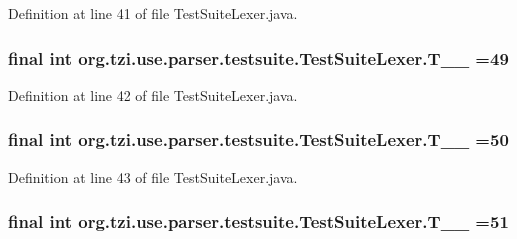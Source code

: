 Definition at line 41 of file Test\-Suite\-Lexer.\-java.

\hypertarget{classorg_1_1tzi_1_1use_1_1parser_1_1testsuite_1_1_test_suite_lexer_a32aa23d39ec0d05cee4b4039a1a57208}{
\subsubsection[{T\-\_\-\-\_\-49}]{\setlength{\rightskip}{0pt plus 5cm}final int org.\-tzi.\-use.\-parser.\-testsuite.\-Test\-Suite\-Lexer.\-T\-\_\-\-\_ =49\hspace{0.3cm}{\ttfamily [static]}}}\label{classorg_1_1tzi_1_1use_1_1parser_1_1testsuite_1_1_test_suite_lexer_a32aa23d39ec0d05cee4b4039a1a57208}


Definition at line 42 of file Test\-Suite\-Lexer.\-java.

\hypertarget{classorg_1_1tzi_1_1use_1_1parser_1_1testsuite_1_1_test_suite_lexer_a9e20bc72218c51260d98c6f5917540a0}{
\subsubsection[{T\-\_\-\-\_\-50}]{\setlength{\rightskip}{0pt plus 5cm}final int org.\-tzi.\-use.\-parser.\-testsuite.\-Test\-Suite\-Lexer.\-T\-\_\-\-\_ =50\hspace{0.3cm}{\ttfamily [static]}}}\label{classorg_1_1tzi_1_1use_1_1parser_1_1testsuite_1_1_test_suite_lexer_a9e20bc72218c51260d98c6f5917540a0}


Definition at line 43 of file Test\-Suite\-Lexer.\-java.

\hypertarget{classorg_1_1tzi_1_1use_1_1parser_1_1testsuite_1_1_test_suite_lexer_afb86e8509be6e9d87b216397c28a57da}{
\subsubsection[{T\-\_\-\-\_\-51}]{\setlength{\rightskip}{0pt plus 5cm}final int org.\-tzi.\-use.\-parser.\-testsuite.\-Test\-Suite\-Lexer.\-T\-\_\-\-\_ =51\hspace{0.3cm}{\ttfamily [static]}}}\label{classorg_1_1tzi_1_1use_1_1parser_1_1testsuite_1_1_test_suite_lexer_afb86e8509be6e9d87b216397c28a57da}


